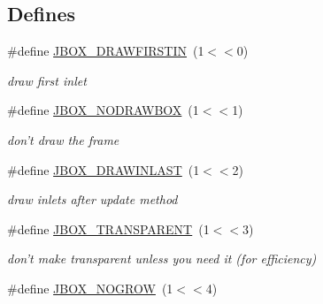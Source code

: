 \subsection*{Defines}
\begin{DoxyCompactItemize}
\item 
\hypertarget{group__jbox_ga9f21c69e60543de2ecbcc94db526134b}{
\#define \hyperlink{group__jbox_ga9f21c69e60543de2ecbcc94db526134b}{JBOX\_\-DRAWFIRSTIN}~(1$<$$<$0)}
\label{group__jbox_ga9f21c69e60543de2ecbcc94db526134b}

\begin{DoxyCompactList}\small\item\em draw first inlet \item\end{DoxyCompactList}\item 
\hypertarget{group__jbox_ga5b6543cfc10a8912a82cebada525a770}{
\#define \hyperlink{group__jbox_ga5b6543cfc10a8912a82cebada525a770}{JBOX\_\-NODRAWBOX}~(1$<$$<$1)}
\label{group__jbox_ga5b6543cfc10a8912a82cebada525a770}

\begin{DoxyCompactList}\small\item\em don't draw the frame \item\end{DoxyCompactList}\item 
\hypertarget{group__jbox_ga651b41a98977ffddd7ca2be78d01f37b}{
\#define \hyperlink{group__jbox_ga651b41a98977ffddd7ca2be78d01f37b}{JBOX\_\-DRAWINLAST}~(1$<$$<$2)}
\label{group__jbox_ga651b41a98977ffddd7ca2be78d01f37b}

\begin{DoxyCompactList}\small\item\em draw inlets after update method \item\end{DoxyCompactList}\item 
\hypertarget{group__jbox_ga3a5253e4b79d030934557351547c71ba}{
\#define \hyperlink{group__jbox_ga3a5253e4b79d030934557351547c71ba}{JBOX\_\-TRANSPARENT}~(1$<$$<$3)}
\label{group__jbox_ga3a5253e4b79d030934557351547c71ba}

\begin{DoxyCompactList}\small\item\em don't make transparent unless you need it (for efficiency) \item\end{DoxyCompactList}\item 
\hypertarget{group__jbox_ga9e535a38aa4960b6ed5f47f361c3bd09}{
\#define \hyperlink{group__jbox_ga9e535a38aa4960b6ed5f47f361c3bd09}{JBOX\_\-NOGROW}~(1$<$$<$4)}
\label{group__jbox_ga9e535a38aa4960b6ed5f47f361c3bd09}


\end{DoxyCompactItemize}
